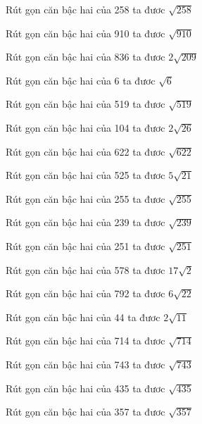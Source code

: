 \documentclass[12pt,a4paper]{article}
\begin{document}
\begin{ex}
Rút gọn căn bậc hai của 258 ta đươc $\sqrt{258}$
\end{ex}
\begin{ex}
Rút gọn căn bậc hai của 910 ta đươc $\sqrt{910}$
\end{ex}
\begin{ex}
Rút gọn căn bậc hai của 836 ta đươc $2\sqrt{209}$
\end{ex}
\begin{ex}
Rút gọn căn bậc hai của 6 ta đươc $\sqrt{6}$
\end{ex}
\begin{ex}
Rút gọn căn bậc hai của 519 ta đươc $\sqrt{519}$
\end{ex}
\begin{ex}
Rút gọn căn bậc hai của 104 ta đươc $2\sqrt{26}$
\end{ex}
\begin{ex}
Rút gọn căn bậc hai của 622 ta đươc $\sqrt{622}$
\end{ex}
\begin{ex}
Rút gọn căn bậc hai của 525 ta đươc $5\sqrt{21}$
\end{ex}
\begin{ex}
Rút gọn căn bậc hai của 255 ta đươc $\sqrt{255}$
\end{ex}
\begin{ex}
Rút gọn căn bậc hai của 239 ta đươc $\sqrt{239}$
\end{ex}
\begin{ex}
Rút gọn căn bậc hai của 251 ta đươc $\sqrt{251}$
\end{ex}
\begin{ex}
Rút gọn căn bậc hai của 578 ta đươc $17\sqrt{2}$
\end{ex}
\begin{ex}
Rút gọn căn bậc hai của 792 ta đươc $6\sqrt{22}$
\end{ex}
\begin{ex}
Rút gọn căn bậc hai của 44 ta đươc $2\sqrt{11}$
\end{ex}
\begin{ex}
Rút gọn căn bậc hai của 714 ta đươc $\sqrt{714}$
\end{ex}
\begin{ex}
Rút gọn căn bậc hai của 743 ta đươc $\sqrt{743}$
\end{ex}
\begin{ex}
Rút gọn căn bậc hai của 435 ta đươc $\sqrt{435}$
\end{ex}
\begin{ex}
Rút gọn căn bậc hai của 357 ta đươc $\sqrt{357}$
\end{ex}
\end{document}
